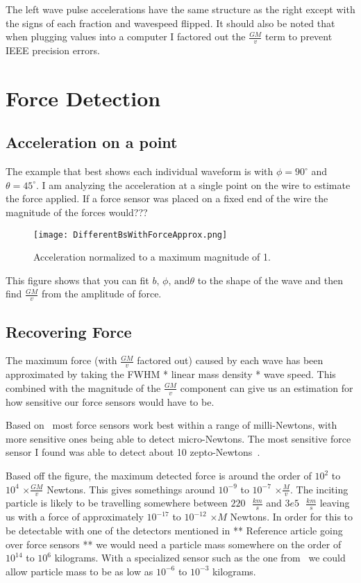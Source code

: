 \documentclass{report}
\begin{document}
The left wave pulse accelerations have the same structure as the right except with the signs of each fraction and wavespeed flipped.
It should also be noted that when plugging values into a computer I factored out the $\frac{G M}{v}$ term to prevent IEEE precision errors.


\chapter*{Force Detection}
\section*{Acceleration on a point}
The example that best shows each individual waveform is with $\phi = 90^\circ$ and $\theta = 45^\circ$. I am analyzing the acceleration at a single point on the wire to estimate the force applied. If a force sensor was
placed on a fixed end of the wire the magnitude of the forces would??? %

\begin{figure}[H]
    \texttt{[image: DifferentBsWithForceApprox.png]}
    \caption{Acceleration normalized to a maximum magnitude of 1.}
\end{figure}

This figure shows that you can fit $b \text{, } \phi \text{, and} \theta$ to the shape of the wave and then find $\frac{G M}{v}$ from the amplitude of force.

\section*{Recovering Force}
The maximum force (with $\frac{G M}{v}$ factored out) caused by each wave has been approximated by taking the FWHM * linear mass density * wave speed. This combined with 
the magnitude of the $\frac{G M}{v}$ component can give us an estimation for how sensitive our force sensors would have to be.

Based on~\cite{WEI2015359} most force sensors work best within a range of milli-Newtons, with more sensitive ones being able to detect micro-Newtons.
The most sensitive force sensor I found was able to detect about 10 zepto-Newtons~\cite{Moser2013}. 

Based off the figure, the maximum detected force is around the order of $10^2$ to $10^4$ $\times \frac{G M}{v}$ Newtons. This gives somethings around $10^{-9}$ to $10^{-7}$ $\times \frac{M}{v}$. 
The inciting particle is likely to be travelling somewhere between $220 \text{ } \frac{km}{s}$ and $3e5 \text{ } \frac{km}{s}$ leaving us with a force of approximately $10^{-17}$ to $10^{-12}$ $\times M$ Newtons.
In order for this to be detectable with one of the detectors mentioned in ** Reference article going over force sensors ** we would need a particle mass somewhere on the order of $10^{14}$ to $10^{6}$ kilograms. 
With a specialized sensor such as the one from~\cite{Moser2013} we could allow particle mass to be as low as $10^{-6}$ to $10^{-3}$ kilograms. 
\end{document}
